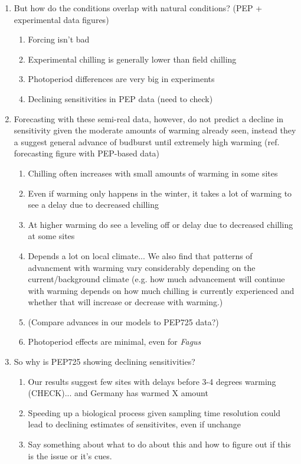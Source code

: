 \documentclass[11pt,letter]{article}
\begin{document}
{\begin{enumerate}
\item But how do the conditions overlap with natural conditions? (PEP + experimental data figures)
\begin{enumerate}
\item Forcing isn't bad
\item Experimental chilling is generally lower than field chilling
\item Photoperiod differences are very big in experiments
\item Declining sensitivities in PEP data (need to check)
\end{enumerate}

\item Forecasting with these semi-real data, however, do not predict a decline in sensitivity given the moderate amounts of warming already seen, instead they a suggest general advance of budburst until extremely high warming (ref. forecasting figure with PEP-based data)

\begin{enumerate}
\item Chilling often increases with small amounts of warming in some sites
\item Even if warming only happens in the winter, it takes a lot of warming to see a delay due to decreased chilling
\item At higher warming do see a leveling off or delay due to decreased chilling at some sites
\item Depends a lot on local climate... We also find that patterns of advancment with warming vary considerably depending on the current/background climate (e.g. how much advancement will continue with warming depends on how much chilling is currently experienced and whether that will increase or decrease with warming.)
\item (Compare advances in our models to PEP725 data?)
\item Photoperiod effects are minimal, even for \emph{Fagus}
\end{enumerate}

\item So why is PEP725 showing declining sensitivities?

\begin{enumerate}
\item Our results suggest few sites with delays before 3-4 degrees warming (CHECK)... and Germany has warmed X amount
\item Speeding up a biological process given sampling time resolution could lead to declining estimates of sensitivites, even if unchange
\item Say something about what to do about this and how to figure out if this is the issue or it's cues. 
\end{enumerate}


\end{enumerate}}
\end{document}
